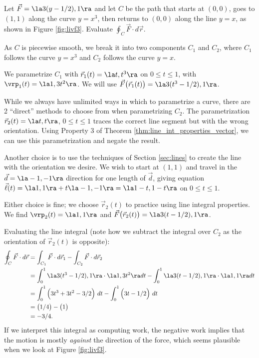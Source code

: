 {Let $\vec F = \la 3(y-1/2),1\ra$ and let $C$ be the path that starts at $(0,0)$, goes to $(1,1)$ along the curve $y=x^3$, then returns to $(0,0)$ along the line $y=x$, as shown in Figure \ref{fig:livf3}. Evaluate $\oint_C \vec F\cdot d\vec r$.
}
{As $C$ is piecewise smooth, we break it into two components $C_1$ and $C_2$, where $C_1$ follows the curve $y=x^3$ and $C_2$ follows the curve $y=x$. 

We parametrize $C_1$ with $\vec r_1(t) = \la t, t^3\ra$ on $0\leq t\leq 1$, with $\vrp_1(t) = \la 1,3t^2\ra$. We will use $\vec F\big(\vec r_1(t)\big) = \la 3(t^3-1/2),1\ra$.

While we always have unlimited ways in which to parametrize a curve, there are 2 ``direct'' methods to choose from when parametrizing $C_2$. The parametrization $\vec r_2(t)=\la t,t\ra$, $0\leq t\leq 1$ traces the correct line segment but with the wrong orientation. Using Property 3 of Theorem \ref{thm:line_int_properties_vector}, we can use this parametrization and negate the result.

Another choice is to use the techniques of Section \ref{sec:lines} to create the line with the orientation we desire. We wish to start at $( 1,1)$ and travel in the $\vec d = \la -1,-1\ra$ direction for one length of $\vec d$, giving equation $\vec \ell(t) = \la 1,1\ra + t\la -1,-1\ra = \la 1-t,1-t\ra$ on $0\leq t\leq 1$.

Either choice is fine; we choose $\vec r_2(t)$ to practice using line integral properties. We find $\vrp_2(t) = \la 1,1\ra$ and $\vec F\big(\vec r_2(t)\big) = \la 3(t-1/2),1\ra$.

Evaluating the line integral (note how we subtract the integral over $C_2$ as the orientation of $\vec r_2(t)$ is opposite):
\begin{align*}
\oint_C \vec F\cdot d\vec r &= \int_{C_1}\vec F\cdot d\vec r_1 - \int_{C_2}\vec F\cdot d\vec r_2 \\
			&= \int_0^1 \la 3(t^3-1/2),1\ra\cdot \la 1,3t^2\ra dt- \int_0^1 \la 3(t-1/2),1\ra\cdot\la 1,1\ra dt \\
			&= \int_0^1\Big(3t^3+3t^2-3/2\Big)\ dt - \int_0^1 \Big(3t-1/2\Big)\ dt\\
			&= \big(1/4 \big) - \big(1\big)\\
			&=	-3/4.
\end{align*}
If we interpret this integral as computing work, the negative work implies that the motion is mostly \emph{against} the direction of the force, which seems plausible when we look at Figure \ref{fig:livf3}.
}\\

